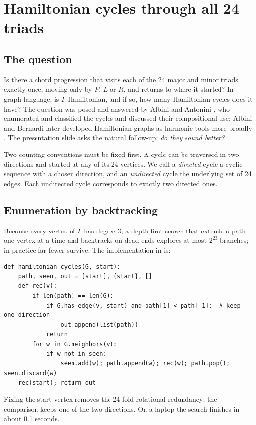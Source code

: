 \chapter{Hamiltonian cycles through all 24 triads}\label{ch:ham}

\section{The question}
Is there a chord progression that visits each of the 24 major and minor triads exactly once, moving only by
$P$, $L$ or $R$, and returns to where it started? In graph language: is $\Gamma$ Hamiltonian, and if so, how
many Hamiltonian cycles does it have? The question was posed and answered by Albini and Antonini
\citep{albini2009}, who enumerated and classified the cycles and discussed their compositional use; Albini and
Bernardi later developed Hamiltonian graphs as harmonic tools more broadly \citep{albini2017}. The presentation
slide asks the natural follow-up: \emph{do they sound better?}

Two counting conventions must be fixed first. A cycle can be traversed in two directions and started at any of
its 24 vertices. We call a \emph{directed} cycle a cyclic sequence with a chosen direction, and an
\emph{undirected} cycle the underlying set of 24 edges. Each undirected cycle corresponds to exactly two directed
ones.

\section{Enumeration by backtracking}
Because every vertex of $\Gamma$ has degree 3, a depth-first search that extends a path one vertex at a time and
backtracks on dead ends explores at most $2^{23}$ branches; in practice far fewer survive. The implementation in
 is:
\begin{lstlisting}
def hamiltonian_cycles(G, start):
    path, seen, out = [start], {start}, []
    def rec(v):
        if len(path) == len(G):
            if G.has_edge(v, start) and path[1] < path[-1]:  # keep one direction
                out.append(list(path))
            return
        for w in G.neighbors(v):
            if w not in seen:
                seen.add(w); path.append(w); rec(w); path.pop(); seen.discard(w)
    rec(start); return out
\end{lstlisting}
Fixing the start vertex removes the 24-fold rotational redundancy; the comparison 
keeps one of the two directions. On a laptop the search finishes in about 0.1 seconds.


